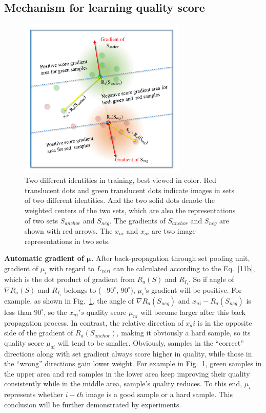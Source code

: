 \subsection{Mechanism for learning quality score}

\begin{figure}[!htbp]
  \centering
  \includegraphics[width=8cm]{figure_gradient.pdf}
  \caption{Two different identities in training, best viewed in color. Red translucent dots and green translucent dots indicate images in sets of two different identities. And the two solid dots denote the weighted centers of the two sets, which are also the representations of two sets $S_{anchor}$ and  $S_{neg}$. The gradients of $S_{anchor}$ and  $S_{neg}$ are shown with red arrows. The $x_{ni}$ and $x_{ai}$ are two image representations in two sets.} 
  \label{fig:gradient}
\end{figure}

\textbf{Automatic gradient of $\mathbf{\mu}$.}
After back-propagation through set pooling unit, gradient of $\mu_i$ with regard to $L_{veri}$ can be calculated according to the Eq.~\ref{11b}, which is the dot product of gradient from $R_a(S)$ and $R_{I_i}$. So if angle of $\nabla R_a(S)$ and $R_{I_i}$ belongs to ($-90^{\circ}$, $90^{\circ}$), $\mu_i$'s gradient will be positive. For example, as shown in Fig.~\ref{fig:gradient}, the angle of $\nabla R_a(S_{neg})$ and $x_{ni}-R_a(S_{neg})$ is less than $90^{\circ}$, so the $x_{ni}'s$ quality score $\mu_{ni}$ will become larger after this back propagation process. In contrast, the relative direction of $x_ai$ is in the opposite side of the gradient of $R_a(S_{anchor})$, making it obviously a hard sample, so its quality score $\mu_{ai}$ will tend to be smaller. Obviously, samples in the ``correct'' directions along with set gradient  always score higher in quality, while those in the ``wrong'' directions gain lower weight. For example in Fig.~\ref{fig:gradient}, green samples in the upper area and red samples in the lower area keep improving their quality consistently while in the middle area, sample's quality reduces. To this end, $\mu_i$ represents whether $i-th$ image is a good sample or a hard sample. This conclusion will be further demonstrated by experiments.

